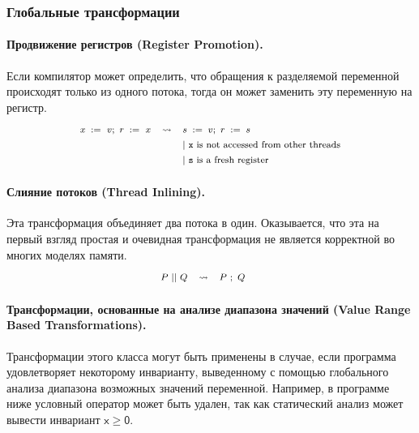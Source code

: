 \subsubsection{Глобальные трансформации}

\paragraph{
Продвижение регистров
(Register Promotion).
}

Если компилятор может определить, что 
обращения к разделяемой переменной 
происходят только из одного потока,
тогда он может заменить эту переменную на регистр.
%
\[\def\arraystretch{1.4}\footnotesize
  \begin{array}{ccl} 

      \writeInst{}{x}{v} \seq \readInst{}{r}{x} 
    & \leadsto 
    & \assignInst{s}{v} \seq \assignInst{r}{s}
    \\ 
    
    & & |~ \text{\texttt{x} is not accessed from other threads} \\
    & & |~ \text{\texttt{s} is a fresh register} \\ 

  \end{array}
\]

\paragraph{Слияние потоков (Thread Inlining).}

Эта трансформация объединяет два потока в один.
Оказывается, что эта на первый взгляд простая и очевидная
трансформация не является корректной во многих моделях памяти. 
%
\[\def\arraystretch{1.4}\footnotesize
  \begin{array}{cccl} 

      P \pll Q 
    & \leadsto 
    & P ~\seq Q
    & ~ \\ 
    
  \end{array}
\]


\paragraph{
Трансформации, основанные на анализе диапазона значений
(Value Range Based Transformations).
}

Трансформации этого класса могут быть применены в случае,
если программа удовлетворяет некоторому инварианту,
выведенному с помощью глобального анализа 
диапазона возможных значений переменной.
Например, в программе ниже условный оператор
может быть удален, так как статический 
анализ может вывести инвариант 
$\mathsf{x} \geq \mathsf{0}$.

